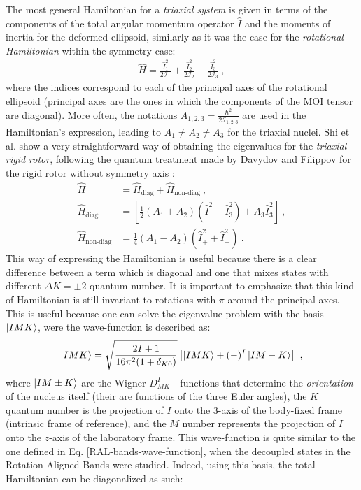 The most general Hamiltonian for a \emph{triaxial system} is given in terms of the components of the total angular momentum operator $\hat{I}$ and the moments of inertia for the deformed ellipsoid, similarly as it was the case for the \emph{rotational Hamiltonian} within the symmetry case:
\begin{align}
    \hat{H}=\frac{\hat{I}_1^2}{2\mathcal{I}_1}+\frac{\hat{I}_2^2}{2\mathcal{I}_2}+\frac{\hat{I}_3^2}{2\mathcal{I}_3}\ ,
\end{align}
where the indices correspond to each of the principal axes of the rotational ellipsoid (principal axes are the ones in which the components of the MOI tensor are diagonal). More often, the notations $A_{1,2,3}=\frac{\hbar^2}{2\mathcal{I}_{1,2,3}}$ are used in the Hamiltonian's expression, leading to $A_1\neq A_2\neq A_3$ for the triaxial nuclei. Shi et al. \cite{wen2015wobbling} show a very straightforward way of obtaining the eigenvalues for the \emph{triaxial rigid rotor}, following the quantum treatment made by Davydov and Filippov for the rigid rotor without symmetry axis \cite{davydov1958rotational}:
\begin{align}
    \hat{H}&=\hat{H}_\text{diag}+\hat{H}_\text{non-diag}\ ,\nonumber\\
    \hat{H}_\text{diag}&=\left[\frac{1}{2}\left(A_1+A_2\right)\left(\hat{I}^2-\hat{I}_3^2\right)+A_3\hat{I}_3^2\right]\ ,\nonumber\\
    \hat{H}_\text{non-diag}&=\frac{1}{4}\left(A_1-A_2\right)\left(\hat{I}_+^2+\hat{I}_-^2\right)\ .
\end{align}
This way of expressing the Hamiltonian is useful because there is a clear difference between a term which is diagonal and one that mixes states with different $\Delta K=\pm2$ quantum number. It is important to emphasize that this kind of Hamiltonian is still invariant to rotations with $\pi$ around the principal axes. This is useful because one can solve the eigenvalue problem with the basis $\ket{IMK}$, were the wave-function is described as:
\begin{align}
    \ket{IMK}=\sqrt{\frac{2I+1}{16\pi^2(1+\delta_{K0})}}\left[\ket{IMK}+(-)^I\ket{IM-K}\right]\ ,
\end{align}
where $\ket{IM\pm K}$ are the Wigner $D_{MK}^I$ - functions that determine the \emph{orientation} of the nucleus itself (their are functions of the three Euler angles), the $K$ quantum number is the projection of $I$ onto the 3-axis of the body-fixed frame (intrinsic frame of reference), and the $M$ number represents the projection of $I$ onto the $z$-axis of the laboratory frame. This wave-function is quite similar to the one defined in Eq. \ref{RAL-bands-wave-function}, when the decoupled states in the Rotation Aligned Bands were studied. Indeed, using this basis, the total Hamiltonian can be diagonalized \cite{wen2015wobbling} as such:
